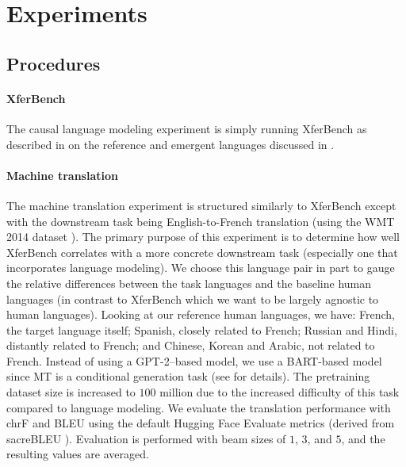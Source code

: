 \section{Experiments}



\subsection{Procedures}
\unskip\label{sec:exp-proc}

\paragraph{XferBench}
The causal language modeling experiment is simply running XferBench as described in  on the reference and emergent languages discussed in .

\paragraph{Machine translation}
The machine translation experiment is structured similarly to XferBench except with the downstream task being English-to-French translation (using the WMT 2014 dataset \citep{bojar2014wmt}).
The primary purpose of this experiment is to determine how well XferBench correlates with a more concrete downstream task (especially one that incorporates language modeling).
We choose this language pair in part to gauge the relative differences between the task languages and the baseline human languages (in contrast to XferBench which we want to be largely agnostic to human languages).
Looking at our reference human languages, we have:
  French, the target language itself;
  Spanish, closely related to French;
  Russian and Hindi, distantly related to French;
  and Chinese, Korean and Arabic, not related to French.
Instead of using a GPT-2--based model, we use a BART-based model since MT is a conditional generation task (see  for details).
The pretraining dataset size is increased to $100$ million due to the increased difficulty of this task compared to language modeling.
We evaluate the translation performance with chrF \citep{chrf} and BLEU \citep{bleu} using the default Hugging Face Evaluate metrics (derived from sacreBLEU \citep{post-2018-call}).
Evaluation is performed with beam sizes of $1$, $3$, and $5$, and the resulting values are averaged.

